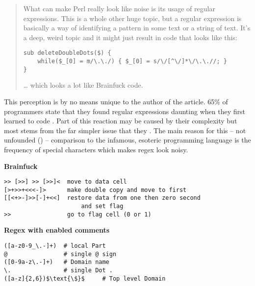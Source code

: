 {\small
\begin{quote}
    What can make Perl really look like noise is its usage of regular expressions. This is a whole other huge topic, but a regular expression is basically a way of identifying a pattern in some text or a string of text. It's a deep, weird topic and it might just result in code that looks like this:

\vspace{1cm}
\begin{minipage}{\linewidth}
\begin{verbatim}
sub deleteDoubleDots($) { 
    while($_[0] = m/\.\./) { $_[0] = s/\/[^\/]*\/\.\.//; } 
}
\end{verbatim}
\end{minipage}

… which looks a lot like Brainfuck code.
\end{quote}

}

This perception is by no means unique to the author of the article. 65\% of programmers state that they found regular expressions daunting when they first learned to code \cite{RegexesAreHard}. Part of this reaction may be caused by their complexity but most stems from the far simpler issue that they  \cite{ViceProgrammingLanguagesProgrammersHate}. The main reason for this  -- not unfounded () -- comparison to the infamous, esoteric programming language is the frequency of special characters which makes regex look noisy.


{
\hypersetup{citecolor=white}
\begin{listingBox}[title={Comparison of Brainfuck \cite{brainfuckExample} and regex \cite{regexWithComments}},label=fig:regexVsBrainfuck,width=15.7cm,center]
\begin{flushleft} \textbf{Brainfuck} \end{flushleft}
\vspace{-1em}
\begin{lstlisting}[basicstyle=\ttfamily]
>> [>>] >> [>>]<  move to data cell
[>+>>+<<<-]>      make double copy and move to first
[[<+>-]>>[-]+<<]  restore data from one then zero second 
                      and set flag
>>                go to flag cell (0 or 1)
\end{lstlisting}
\tcblower
\textbf{Regex with enabled comments}
    \begin{lstlisting}[basicstyle=\ttfamily,mathescape=true]
([a-z0-9_\.-]+)  # local Part
@                # single @ sign
([0-9a-z\.-]+)   # Domain name
\.               # single Dot .
([a-z]{2,6})$\text{\$}$     # Top level Domain
\end{lstlisting}
\end{listingBox}
}


